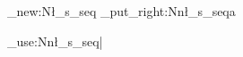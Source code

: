 \ExplSyntaxOn
\seq_new:N\l_s_seq
\seq_put_right:Nn\l_s_seq{a}

\seq_use:Nn\l_s_seq{|}
\ExplSyntaxOff
